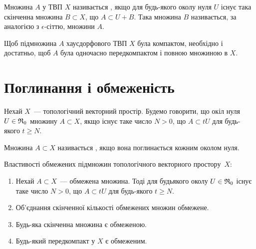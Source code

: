 \begin{definition}
    Множина $A$ у ТВП $X$ називається , якщо для будь-якого околу нуля $U$ існує така скінченна множина $B \subset X$, що $A \subset U + B$. Така множина $B$ називається, за аналогією з $\epsilon$-сіттю,  множини $A$.
\end{definition}

\begin{theorem}
    Щоб підмножина $A$ хаусдорфового ТВП $X$ була компактом, необхідно і достатньо, щоб $A$ була одночасно передкомпактом і повною множиною в $X$.
\end{theorem}

\section{Поглинання і обмеженість}

\begin{definition}
    Нехай $X$~--- топологічний векторний простір. Будемо говорити, що окіл нуля $U \in \frak R_0$  множину $A \subset X$, якщо існує таке число $N > 0$, що $A \subset t U$ для будь-якого $t \ge N$.
\end{definition}

\begin{definition}
    Множина $A \subset X$ називається , якщо вона поглинається кожним околом нуля.
\end{definition}

\begin{theorem}
    Властивості обмежених підмножин топологічного векторного простору~$X$:
    \begin{enumerate}
        \item Нехай $A \subset X$~--- обмежена множина. Тоді для будьякого околу $U \in \frak R_0$ існує таке число $N > 0$, що $A \subset t U$ для будь-якого $t \ge N$.

        \item Об'єднання скінченної кількості обмежених множин обмежене.

        \item Будь-яка скінченна множина є обмеженою.

        \item Будь-який передкомпакт у $X$ є обмеженим.
    \end{enumerate}
\end{theorem}

